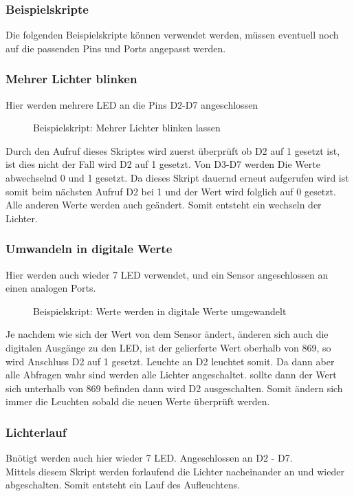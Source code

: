 \subsubsection{Beispielskripte}
Die folgenden Beispielskripte können verwendet werden, müssen eventuell noch auf
die passenden Pins und Ports angepasst werden. 

\subsubsection{Mehrer Lichter blinken}

Hier werden mehrere LED an die Pins D2-D7 angeschlossen\
\begin{figure}[H]

\caption{Beispielskript: Mehrer Lichter blinken lassen}
\label{output}
\end{figure}

Durch den Aufruf dieses Skriptes wird zuerst überprüft ob D2 auf 1
gesetzt ist, ist dies nicht der Fall wird D2 auf 1 gesetzt. Von D3-D7
werden Die Werte abwechselnd 0 und 1 gesetzt. Da dieses Skript dauernd
erneut aufgerufen wird ist somit beim nächsten Aufruf D2 bei 1 und der
Wert wird folglich auf 0 gesetzt. Alle anderen Werte werden auch
geändert. Somit entsteht ein wechseln der Lichter.\newline

\subsubsection{Umwandeln in digitale Werte}
Hier werden auch wieder 7 LED verwendet, und ein Sensor angeschlossen
an einen analogen Ports.
\begin{figure}[H]

\caption{Beispielskript: Werte werden in digitale Werte umgewandelt}
\label{output}
\end{figure}
Je nachdem wie sich der Wert von dem Sensor ändert, änderen sich auch die
digitalen Ausgänge zu den LED, ist der gelierferte Wert oberhalb von
869, so wird Anschluss D2 auf 1 gesetzt. Leuchte an D2 leuchtet somit. Da dann
aber alle Abfragen wahr sind werden alle Lichter angeschaltet. sollte dann der
Wert sich unterhalb von 869 befinden dann wird D2 ausgeschalten. Somit ändern
sich immer die Leuchten sobald die neuen Werte überprüft werden.

\subsubsection{Lichterlauf}
Bnötigt werden auch hier wieder 7 LED. Angeschlossen an D2 - D7.\\
Mittels diesem Skript werden forlaufend die Lichter nacheinander an und wieder
abgeschalten. Somit entsteht ein Lauf des Aufleuchtens.\newline

